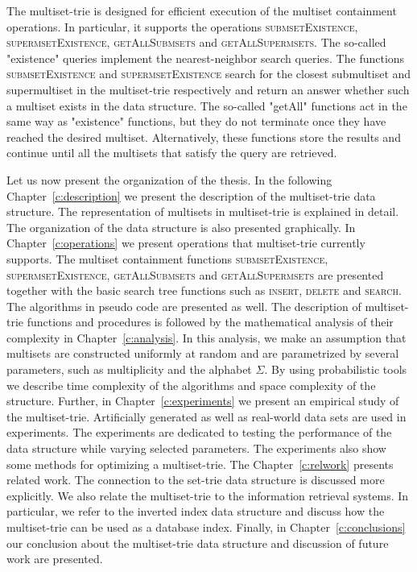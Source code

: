 The multiset-trie is designed for efficient execution of the multiset containment 
operations. In particular, it supports the operations \textsc{submsetExistence}, 
\textsc{supermsetExistence}, \textsc{getAllSubmsets} and \textsc{getAllSupermsets}. 
The so-called "existence" queries implement the nearest-neighbor search queries. The 
functions \textsc{submsetExistence} and \textsc{supermsetExistence} search for 
the closest submultiset and supermultiset in the multiset-trie respectively and return 
an answer whether such a multiset exists in the data structure. The so-called 
"getAll" functions act in the same way as "existence" functions, but they do not 
terminate once they have reached the desired multiset. Alternatively, these functions 
store the results and continue until all the multisets that satisfy the query are retrieved. 

%
Let us now present the organization of the thesis. 
In the following Chapter~\ref{c:description} we present the description of the 
multiset-trie data structure. The representation of multisets in multiset-trie is 
explained in detail. The organization of the data structure is also presented 
graphically.
%
In Chapter~\ref{c:operations} we present operations that multiset-trie currently 
supports. The multiset containment functions \textsc{submsetExistence}, 
\textsc{supermsetExistence}, \textsc{getAllSubmsets} and \textsc{getAllSupermsets} 
are presented together with the basic search tree functions such as \textsc{insert}, 
\textsc{delete} and \textsc{search}. The algorithms in pseudo code are presented 
as well. 
%
The description of multiset-trie functions and procedures is followed by the 
mathematical analysis of their complexity in Chapter~\ref{c:analysis}. 
In this analysis, we make an assumption that multisets are constructed uniformly at 
random and are parametrized by several parameters, such as multiplicity and the alphabet 
$\Sigma.$ By using probabilistic tools we describe time complexity of the algorithms 
and space complexity of the structure.
%
Further, in Chapter~\ref{c:experiments} we present an empirical study of the 
multiset-trie. Artificially generated as well as real-world data sets are used in experiments. 
The experiments are dedicated to testing the performance of the data structure while 
varying selected parameters. The experiments also show some methods for 
optimizing a multiset-trie.
%
The Chapter~\ref{c:relwork} presents related work. The connection to the set-trie 
data structure \cite{savnik2013index} is discussed more explicitly. We also relate 
the multiset-trie to the information retrieval systems. In particular, we refer to the 
inverted index data structure and discuss how the multiset-trie can be used as a 
database index.
%
Finally, in Chapter~\ref{c:conclusions} our conclusion about the multiset-trie 
data structure and discussion of future work are presented.